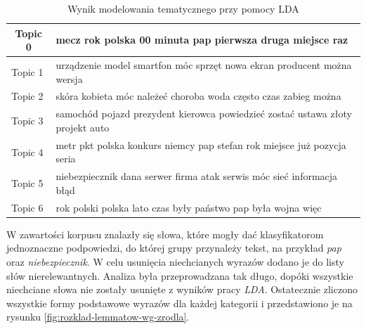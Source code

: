 \begin{table}[ht!]
\centering
\caption{Wynik modelowania tematycznego przy pomocy LDA}
\label{tab:lda-result}
\begin{tabular}{|l|l|}
\hline
\multicolumn{1}{|c|}{Topic 0} & mecz rok polska 00 minuta pap pierwsza druga miejsce raz                       \\ \hline
Topic 1                       & urządzenie model smartfon móc sprzęt nowa ekran producent można wersja         \\ \hline
Topic 2                       & skóra kobieta móc należeć choroba woda często czas zabieg można                \\ \hline
Topic 3                       & samochód pojazd prezydent kierowca powiedzieć zostać ustawa złoty projekt auto \\ \hline
Topic 4                       & metr pkt polska konkurs niemcy pap stefan rok miejsce już pozycja seria        \\ \hline
Topic 5                       & niebezpiecznik dana serwer firma atak serwis móc sieć informacja błąd          \\ \hline
Topic 6                       & rok polski polska lato czas były państwo pap była wojna więc                   \\ \hline
\end{tabular}
\end{table}

W zawartości korpusu znalazły się słowa, które mogły dać klasyfikatorom jednoznaczne podpowiedzi, do której grupy przynależy tekst, na przykład \textit{pap} oraz \textit{niebezpiecznik}. W celu usunięcia niechcianych wyrazów dodano je do listy słów nierelewantnych. Analiza była przeprowadzana tak długo, dopóki wszystkie niechciane słowa nie zostały usunięte z wyników pracy \textit{LDA}. Ostatecznie zliczono wszystkie formy podstawowe wyrazów dla każdej kategorii i przedstawiono je na rysunku \ref{fig:rozklad-lemmatow-wg-zrodla}.

